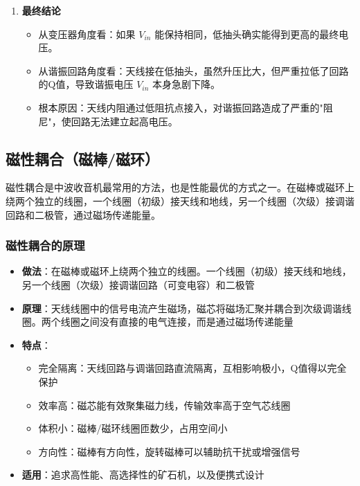 \documentclass[12pt,UTF8]{ctexbook}
\begin{document}
\begin{enumerate}
\begin{itemize}[leftmargin=3.5em]
		\item 高Q值回路：能在谐振时产生很高的电压。
		\item 低Q值回路：谐振峰被抹平，谐振阻抗急剧下降，谐振电压也急剧下降。
		\item 虽然变压器升压比大了，但谐振回路本身产生的电压 $V_{in}$ 因为Q值降低而大幅减小。这个减小的幅度，远远超过了升压比带来的增益。
	\end{itemize}
	\item \textbf{最终结论}
	\begin{itemize}[leftmargin=3.5em]
		\item 从变压器角度看：如果 $V_{in}$ 能保持相同，低抽头确实能得到更高的最终电压。
		\item 从谐振回路角度看：天线接在低抽头，虽然升压比大，但严重拉低了回路的Q值，导致谐振电压 $V_{in}$ 本身急剧下降。
		\item 根本原因：天线内阻通过低阻抗点接入，对谐振回路造成了严重的"阻尼"，使回路无法建立起高电压。
	\end{itemize}
\end{enumerate}

\subsection{磁性耦合（磁棒/磁环）}

磁性耦合是中波收音机最常用的方法，也是性能最优的方式之一。在磁棒或磁环上绕两个独立的线圈，一个线圈（初级）接天线和地线，另一个线圈（次级）接调谐回路和二极管，通过磁场传递能量。

\subsubsection{磁性耦合的原理}

\begin{itemize}[leftmargin=3.5em]
	\item \textbf{做法}：在磁棒或磁环上绕两个独立的线圈。一个线圈（初级）接天线和地线，另一个线圈（次级）接调谐回路（可变电容）和二极管
	\item \textbf{原理}：天线线圈中的信号电流产生磁场，磁芯将磁场汇聚并耦合到次级调谐线圈。两个线圈之间没有直接的电气连接，而是通过磁场传递能量
	\item \textbf{特点}：
	\begin{itemize}[leftmargin=3.5em]
		\item 完全隔离：天线回路与调谐回路直流隔离，互相影响极小，Q值得以完全保护
		\item 效率高：磁芯能有效聚集磁力线，传输效率高于空气芯线圈
		\item 体积小：磁棒/磁环线圈匝数少，占用空间小
		\item 方向性：磁棒有方向性，旋转磁棒可以辅助抗干扰或增强信号
	\end{itemize}
	\item \textbf{适用}：追求高性能、高选择性的矿石机，以及便携式设计
\end{itemize}
\end{document}

